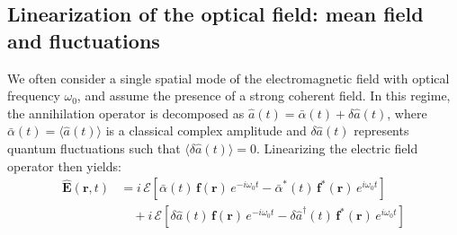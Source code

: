 \subsection*{Linearization of the optical field: mean field and fluctuations}

We often consider a single spatial mode of the electromagnetic field with optical frequency \(\omega_0\), and assume the presence of a strong coherent field. In this regime, the annihilation operator is decomposed as \(\hat{a}(t) = \bar{\alpha}(t) + \delta\hat{a}(t)\), where \(\bar{\alpha}(t)=\langle \hat{a}(t)\rangle\) is a classical complex amplitude and \(\delta\hat{a}(t)\) represents quantum fluctuations such that \(\langle \delta \hat{a}(t)\rangle=0\).
Linearizing the electric field operator then yields:
\begin{equation}
\begin{aligned}
\hat{\mathbf{E}}(\mathbf{r}, t) 
&= i \, \mathcal{E} \left[ \bar{\alpha}(t)\, \mathbf{f}(\mathbf{r})\, e^{-i \omega_0 t} 
- \bar{\alpha}^*(t)\, \mathbf{f}^*(\mathbf{r})\, e^{i \omega_0 t} \right] \\
&\quad + i \, \mathcal{E} \left[ \delta \hat{a}(t)\, \mathbf{f}(\mathbf{r})\, e^{-i \omega_0 t}
- \delta \hat{a}^\dagger(t)\, \mathbf{f}^*(\mathbf{r})\, e^{i \omega_0 t} \right]
\end{aligned}
\end{equation}

